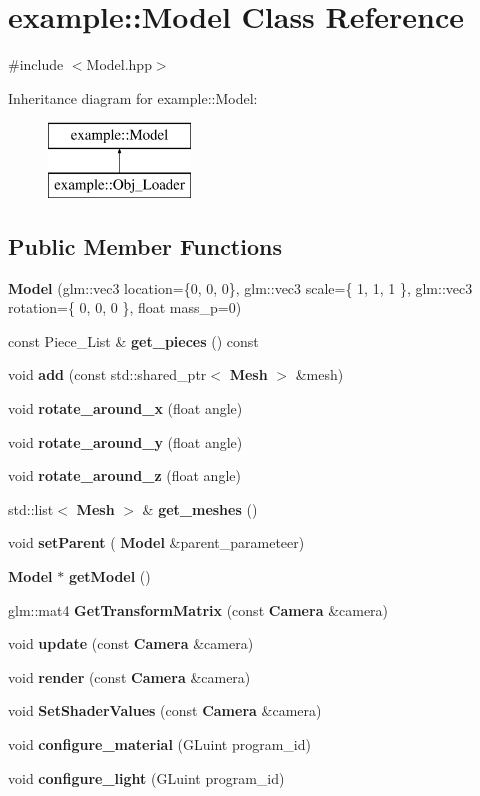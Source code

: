 \section{example\+::Model Class Reference}
\label{classexample_1_1_model}


{\ttfamily \#include $<$Model.\+hpp$>$}

Inheritance diagram for example\+::Model\+:\begin{figure}[H]
\begin{center}
\leavevmode
\includegraphics[height=2.000000cm]{classexample_1_1_model}
\end{center}
\end{figure}
\subsection*{Public Member Functions}
\begin{DoxyCompactItemize}
\item 
\textbf{ Model} (glm\+::vec3 location=\{0, 0, 0\}, glm\+::vec3 scale=\{ 1, 1, 1 \}, glm\+::vec3 rotation=\{ 0, 0, 0 \}, float mass\+\_\+p=0)
\item 
const Piece\+\_\+\+List \& \textbf{ get\+\_\+pieces} () const
\item 
void \textbf{ add} (const std\+::shared\+\_\+ptr$<$ \textbf{ Mesh} $>$ \&mesh)
\item 
void \textbf{ rotate\+\_\+around\+\_\+x} (float angle)
\item 
void \textbf{ rotate\+\_\+around\+\_\+y} (float angle)
\item 
void \textbf{ rotate\+\_\+around\+\_\+z} (float angle)
\item 
std\+::list$<$ \textbf{ Mesh} $>$ \& \textbf{ get\+\_\+meshes} ()
\item 
void \textbf{ set\+Parent} (\textbf{ Model} \&parent\+\_\+parameteer)
\item 
\textbf{ Model} $\ast$ \textbf{ get\+Model} ()
\item 
glm\+::mat4 \textbf{ Get\+Transform\+Matrix} (const \textbf{ Camera} \&camera)
\item 
void \textbf{ update} (const \textbf{ Camera} \&camera)
\item 
void \textbf{ render} (const \textbf{ Camera} \&camera)
\item 
void \textbf{ Set\+Shader\+Values} (const \textbf{ Camera} \&camera)
\item 
void \textbf{ configure\+\_\+material} (G\+Luint program\+\_\+id)
\item 
void \textbf{ configure\+\_\+light} (G\+Luint program\+\_\+id)
\end{DoxyCompactItemize}
